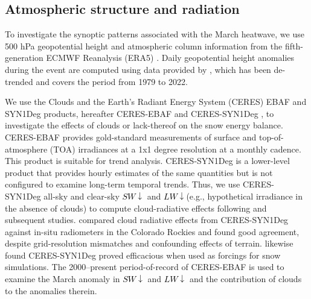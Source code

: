 \documentclass[draft]{agujournal2019}
\newcommand{\lwdn}{\textcolor{black}{$LW\downarrow$}\xspace}
\newcommand{\swdn}{\textcolor{black}{$SW\downarrow$}\xspace}
\begin{document}
\subsection{Atmospheric structure and radiation}
To investigate the synoptic patterns associated with the March heatwave, we use 500 hPa geopotential height and atmospheric column information from the fifth-generation ECMWF Reanalysis (ERA5) \cite{Hersbach2020-era5}.
Daily geopotential height anomalies during the event are computed using data provided by , which has been de-trended and covers the period from 1979 to 2022.

We use the Clouds and the Earth's Radiant Energy System (CERES) EBAF and SYN1Deg products, hereafter CERES-EBAF \cite{Kato2018-pi} and CERES-SYN1Deg \cite{Rutan2015-ar}, to investigate the effects of clouds or lack-thereof on the snow energy balance.
CERES-EBAF provides gold-standard measurements of surface and top-of-atmosphere (TOA) irradiances at a 1x1 degree resolution at a monthly cadence.
This product is suitable for trend analysis.
CERES-SYN1Deg is a lower-level product that provides hourly estimates of the same quantities but is not configured to examine long-term temporal trends.
Thus, we use CERES-SYN1Deg all-sky and clear-sky \swdn and \lwdn (e.g., hypothetical irradiance in the absence of clouds) to compute cloud-radiative effects following  and subsequent studies.
 compared cloud radiative effects from CERES-SYN1Deg against in-situ radiometers in the Colorado Rockies and found good agreement, despite grid-resolution mismatches and confounding effects of terrain.
 likewise found CERES-SYN1Deg proved efficacious when used as forcings for snow simulations. 
The 2000--present period-of-record of CERES-EBAF is used to examine the March anomaly in \swdn and \lwdn and the contribution of clouds to the anomalies therein.
\end{document}

